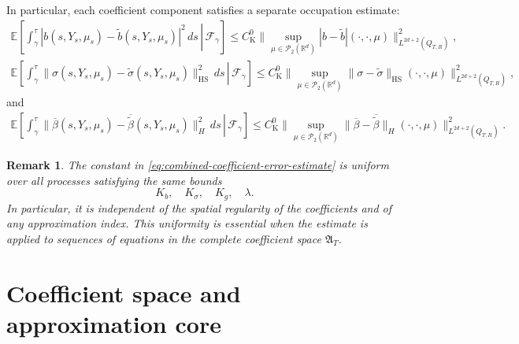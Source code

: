 \documentclass[12pt,oneside, reqno]{amsart}
\newtheorem{remark}[theorem]{Remark}
\numberwithin{equation}{section}
\begin{document}
	
	
	In particular, each coefficient component satisfies a separate occupation estimate:
	\begin{equation}
		\label{eq:drift-error-occupation}
		\begin{aligned}
			\mathbb E\left[
			\left.
			\int_\gamma^\tau
			|b(s,Y_s,\mu_s)
			-\widetilde b(s,Y_s,\mu_s)|^2\,ds
			\,\right|\,\mathcal F_\gamma
			\right]
			\leq
			C_{\mathrm K}^{0}
			\|
			\sup_{\mu\in\mathcal P_2(\mathbb R^d)}
			|b-\widetilde b|(\cdot,\cdot,\mu)
			\|_{L^{2d+2}(Q_{T,R})}^2,
		\end{aligned}
	\end{equation}
	\begin{equation}
		\label{eq:diffusion-error-occupation}
		\begin{aligned}
			\mathbb E\left[
			\left.
			\int_\gamma^\tau
			\|\sigma(s,Y_s,\mu_s)
			-\widetilde\sigma(s,Y_s,\mu_s)\|_{\mathrm{HS}}^2\,ds
			\,\right|\,\mathcal F_\gamma
			\right]
			\leq
			C_{\mathrm K}^{0}
			\|
			\sup_{\mu\in\mathcal P_2(\mathbb R^d)}
			\|\sigma-\widetilde\sigma\|_{\mathrm{HS}}
			(\cdot,\cdot,\mu)
			\|_{L^{2d+2}(Q_{T,R})}^2,
		\end{aligned}
	\end{equation}
	and
	\begin{equation}
		\label{eq:jump-error-occupation}
		\begin{aligned}
			\mathbb E\left[
			\left.
			\int_\gamma^\tau
			\|\overline\beta(s,Y_s,\mu_s)
			-\overline{\widetilde\beta}(s,Y_s,\mu_s)\|_H^2\,ds
			\,\right|\,\mathcal F_\gamma
			\right]
			\leq
			C_{\mathrm K}^{0}
			\|
			\sup_{\mu\in\mathcal P_2(\mathbb R^d)}
			\|\overline\beta-\overline{\widetilde\beta}\|_H
			(\cdot,\cdot,\mu)
			\|_{L^{2d+2}(Q_{T,R})}^2.
		\end{aligned}
	\end{equation}
	
	\begin{remark}
		The constant in
		\eqref{eq:combined-coefficient-error-estimate} is uniform over all
		processes satisfying the same bounds
		\[
		K_b,\quad K_\sigma,\quad K_g,\quad\lambda.
		\]
		In particular, it is independent of the spatial regularity of the
		coefficients and of any approximation index. This uniformity is
		essential when the estimate is applied to sequences of equations in
		the complete coefficient space $\mathfrak A_T$.
	\end{remark}
	
	\section{Coefficient space and approximation core}
	\label{sec:coefficient-space-core}
	
\end{document}
